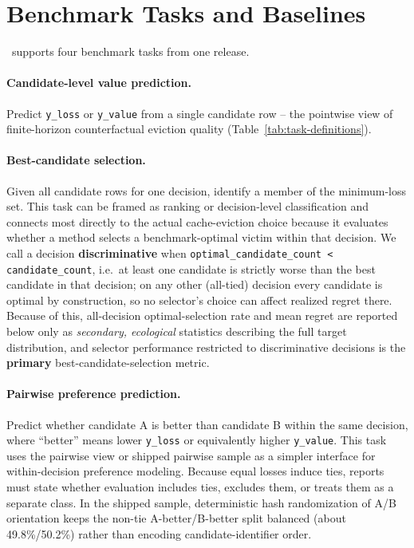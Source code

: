 \section{Benchmark Tasks and Baselines}
\label{sec:tasks-baselines}

\lafc\ supports four benchmark tasks from one release.

\paragraph{Candidate-level value prediction.}
Predict \texttt{y\_loss} or \texttt{y\_value} from a single candidate row -- the pointwise view of finite-horizon counterfactual eviction quality (Table~\ref{tab:task-definitions}).

\paragraph{Best-candidate selection.}
Given all candidate rows for one decision, identify a member of the minimum-loss set. This task can be framed as ranking or decision-level classification and connects most directly to the actual cache-eviction choice because it evaluates whether a method selects a benchmark-optimal victim within that decision. We call a decision \textbf{discriminative} when \texttt{optimal\_candidate\_count < candidate\_count}, i.e.\ at least one candidate is strictly worse than the best candidate in that decision; on any other (all-tied) decision every candidate is optimal by construction, so no selector's choice can affect realized regret there. Because of this, all-decision optimal-selection rate and mean regret are reported below only as \emph{secondary, ecological} statistics describing the full target distribution, and selector performance restricted to discriminative decisions is the \textbf{primary} best-candidate-selection metric.

\paragraph{Pairwise preference prediction.}
Predict whether candidate A is better than candidate B within the same decision, where ``better'' means lower \texttt{y\_loss} or equivalently higher \texttt{y\_value}. This task uses the pairwise view or shipped pairwise sample as a simpler interface for within-decision preference modeling. Because equal losses induce ties, reports must state whether evaluation includes ties, excludes them, or treats them as a separate class. In the shipped sample, deterministic hash randomization of A/B orientation keeps the non-tie A-better/B-better split balanced (about 49.8\%/50.2\%) rather than encoding candidate-identifier order.

